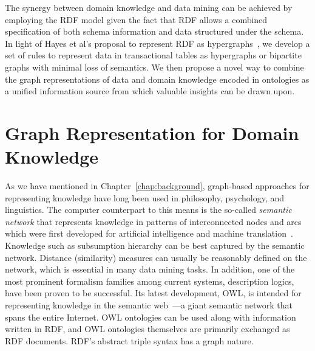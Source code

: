 The synergy between domain knowledge and data mining can be achieved by employing the RDF model given the fact that RDF allows a combined specification of both schema information and data structured under the schema. In light of Hayes et al's proposal to represent RDF as hypergraphs~\cite{GraphModelRDF}, we develop a set of rules to represent data in transactional tables as hypergraphs or bipartite graphs with minimal loss of semantics. We then propose a novel way to combine the graph representations of data and domain knowledge encoded in ontologies as a unified information source from which valuable insights can be drawn upon.


\section{Graph Representation for Domain Knowledge}
As we have mentioned in Chapter~\ref{chap:background}, graph-based approaches for representing knowledge have long been used in philosophy, psychology, and linguistics. The computer counterpart to this means is the so-called \emph{semantic network} that represents knowledge in patterns of interconnected nodes and arcs which were first developed for artificial intelligence and machine translation~\cite{Sowa91principlesof}. Knowledge such as subsumption hierarchy can be best captured by the semantic network. Distance (similarity) measures can usually be reasonably defined on the network, which is essential in many data mining tasks. In addition, one of the most prominent formalism families among current systems, description logics, have been proven to be successful. Its latest development, OWL, is intended for representing knowledge in the semantic web~\cite{Berners-Lee01}---a giant semantic network that spans the entire Internet. OWL ontologies can be used along with information written in RDF, and OWL ontologies themselves are primarily exchanged as RDF documents. RDF's abstract triple syntax has a graph nature.

